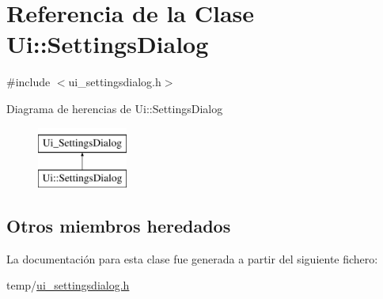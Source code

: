 \hypertarget{class_ui_1_1_settings_dialog}{}\section{Referencia de la Clase Ui\+:\+:Settings\+Dialog}
\label{class_ui_1_1_settings_dialog}


{\ttfamily \#include $<$ui\+\_\+settingsdialog.\+h$>$}

Diagrama de herencias de Ui\+:\+:Settings\+Dialog\begin{figure}[H]
\begin{center}
\leavevmode
\includegraphics[height=2.000000cm]{class_ui_1_1_settings_dialog}
\end{center}
\end{figure}
\subsection*{Otros miembros heredados}


La documentación para esta clase fue generada a partir del siguiente fichero\+:\begin{DoxyCompactItemize}
\item 
temp/\hyperlink{ui__settingsdialog_8h}{ui\+\_\+settingsdialog.\+h}\end{DoxyCompactItemize}
